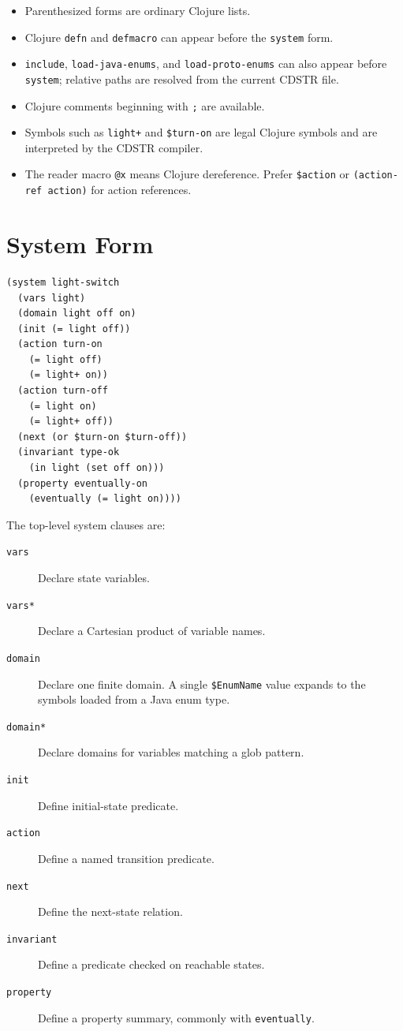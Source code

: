 \documentclass[11pt]{article}
\begin{document}
\begin{itemize}
\item Parenthesized forms are ordinary Clojure lists.
\item Clojure \texttt{defn} and \texttt{defmacro} can appear before the
  \texttt{system} form.
\item \texttt{include}, \texttt{load-java-enums}, and
  \texttt{load-proto-enums} can also appear before \texttt{system}; relative
  paths are resolved from the current CDSTR file.
\item Clojure comments beginning with \texttt{;} are available.
\item Symbols such as \texttt{light+} and \texttt{\$turn-on} are legal Clojure
  symbols and are interpreted by the CDSTR compiler.
\item The reader macro \texttt{@x} means Clojure dereference.  Prefer
  \texttt{\$action} or \texttt{(action-ref action)} for action references.
\end{itemize}

\section{System Form}

\begin{lstlisting}[language=CDSTR]
(system light-switch
  (vars light)
  (domain light off on)
  (init (= light off))
  (action turn-on
    (= light off)
    (= light+ on))
  (action turn-off
    (= light on)
    (= light+ off))
  (next (or $turn-on $turn-off))
  (invariant type-ok
    (in light (set off on)))
  (property eventually-on
    (eventually (= light on))))
\end{lstlisting}

The top-level system clauses are:

\begin{description}
\item[\texttt{vars}] Declare state variables.
\item[\texttt{vars*}] Declare a Cartesian product of variable names.
\item[\texttt{domain}] Declare one finite domain.  A single
  \texttt{\$EnumName} value expands to the symbols loaded from a Java enum type.
\item[\texttt{domain*}] Declare domains for variables matching a glob pattern.
\item[\texttt{init}] Define initial-state predicate.
\item[\texttt{action}] Define a named transition predicate.
\item[\texttt{next}] Define the next-state relation.
\item[\texttt{invariant}] Define a predicate checked on reachable states.
\item[\texttt{property}] Define a property summary, commonly with
  \texttt{eventually}.
\end{description}
\end{document}
